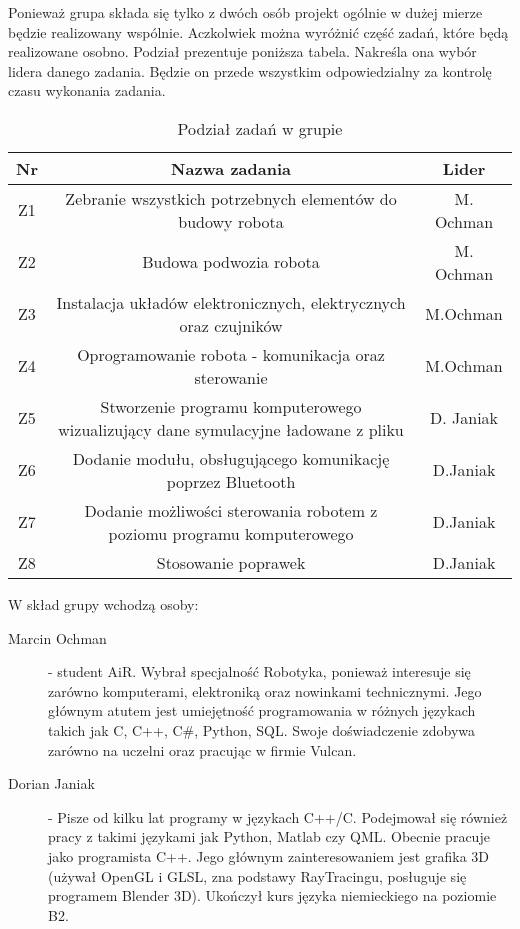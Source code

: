 Ponieważ grupa składa się tylko z dwóch osób projekt ogólnie w dużej mierze będzie realizowany wspólnie. Aczkolwiek można wyróżnić część zadań, które będą realizowane osobno. Podział prezentuje poniższa tabela. Nakreśla ona wybór lidera danego zadania. Będzie on przede wszystkim odpowiedzialny za kontrolę czasu wykonania zadania.



\begin{table}[!htbp]
\begin{center}
\begin{tabular}{|c|c|c|}

\hline
\textbf{Nr} & \textbf{Nazwa zadania} & \textbf{Lider} \\ \hline\hline
Z1 & Zebranie wszystkich potrzebnych elementów do budowy robota & M. Ochman \\ \hline
Z2 & Budowa podwozia robota & M. Ochman \\ \hline
Z3 & Instalacja układów elektronicznych, elektrycznych oraz czujników & M.Ochman \\ \hline
Z4 & Oprogramowanie robota - komunikacja oraz sterowanie & M.Ochman \\ \hline
Z5 &Stworzenie programu komputerowego wizualizujący dane symulacyjne ładowane z pliku & D. Janiak \\ \hline
Z6 & Dodanie modułu, obsługującego komunikację poprzez Bluetooth & D.Janiak \\ \hline
Z7 & Dodanie możliwości sterowania robotem z poziomu programu komputerowego & D.Janiak \\ \hline
Z8 & Stosowanie poprawek & D.Janiak \\ \hline


\end{tabular}
\caption{Podział zadań w grupie}
\end{center}
\end{table}

W skład grupy wchodzą osoby:
\begin{description}
\item[Marcin Ochman] - student AiR. Wybrał specjalność Robotyka, ponieważ interesuje się zarówno komputerami, elektroniką oraz nowinkami technicznymi.
	Jego głównym atutem jest umiejętność programowania w różnych językach takich jak C, C++, C\#, Python, SQL. 
	Swoje doświadczenie zdobywa zarówno na uczelni oraz pracując w firmie Vulcan.	
\item[Dorian Janiak] - Pisze od kilku lat programy w językach C++/C. Podejmował się również pracy z takimi językami jak Python, Matlab czy QML. Obecnie pracuje jako programista C++. Jego głównym zainteresowaniem jest grafika 3D (używał OpenGL i GLSL, zna podstawy RayTracingu, posługuje się programem Blender 3D). Ukończył kurs języka niemieckiego na poziomie B2.
\end{description}
